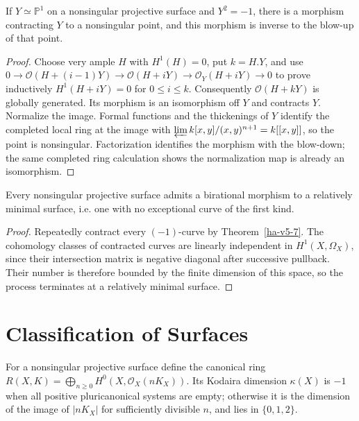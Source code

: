 \begin{theorem}
\label{ha-v5-7}
If \(Y\simeq\mathbb P^1\) on a nonsingular projective surface and \(Y^2=-1\),
there is a morphism contracting \(Y\) to a nonsingular point, and this morphism
is inverse to the blow-up of that point.

\end{theorem}
\begin{proof}
Choose very ample \(H\) with \(H^1(H)=0\), put \(k=H.Y\), and use
\(0\to\mathcal O(H+(i-1)Y)\to\mathcal O(H+iY)\to\mathcal O_Y(H+iY)\to0\)
to prove inductively \(H^1(H+iY)=0\) for \(0\le i\le k\).  Consequently
\(\mathcal O(H+kY)\) is globally generated.  Its morphism is an isomorphism
off \(Y\) and contracts \(Y\).  Normalize the image.  Formal functions and
the thickenings of \(Y\) identify the completed local ring at the image with
\(\varprojlim k[x,y]/(x,y)^{n+1}=k[[x,y]]\), so the point is nonsingular.
Factorization identifies the morphism with the blow-down; the same completed
ring calculation shows the normalization map is already an isomorphism.
\end{proof}

\begin{theorem}
\label{ha-v5-8}
Every nonsingular projective surface admits a birational morphism to a relatively
minimal surface, i.e. one with no exceptional curve of the first kind.
\end{theorem}
\begin{proof}
Repeatedly contract every \((-1)\)-curve by Theorem~\ref{ha-v5-7}.  The
cohomology classes of contracted curves are linearly independent in
\(H^1(X,\Omega_X)\), since their intersection matrix is negative diagonal after
successive pullback.  Their number is therefore bounded by the finite dimension
of this space, so the process terminates at a relatively minimal surface.
\end{proof}

\section{Classification of Surfaces}
\label{ha-v6}

\begin{definition}
For a nonsingular projective surface define the canonical ring
\(R(X,K)=\bigoplus_{n\ge0}H^0(X,\mathcal O_X(nK_X))\).  Its Kodaira dimension
\(\kappa(X)\) is \(-1\) when all positive pluricanonical systems are empty;
otherwise it is the dimension of the image of \(|nK_X|\) for sufficiently
divisible \(n\), and lies in \(\{0,1,2\}\).
\end{definition}

